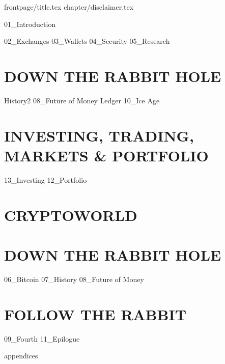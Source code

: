 \documentclass[a4paper,11pt,oneside,hyphens]{book}
\begin{document}
\frontmatter


{frontpage/title.tex}
{chapter/disclaimer.tex}

\clearpage


\tableofcontents


\listoffigures
{}

\listoftables
{}



\mainmatter
\pagestyle{fancy}

{01_Introduction}

{02_Exchanges}
{03_Wallets}
{04_Security}
{05_Research}

\part{DOWN THE RABBIT HOLE}

{History2}
{08_Future of Money}
{Ledger}
{10_Ice Age}

\part{INVESTING, TRADING, MARKETS \& PORTFOLIO}

{13_Investing}
{12_Portfolio}

\part{CRYPTOWORLD}


\part*{DOWN THE RABBIT HOLE}

{06_Bitcoin}
{07_History} 
{08_Future of Money} 

\part*{FOLLOW THE RABBIT}

{09_Fourth} 
{11_Epilogue}




\appendix
{appendices}



\backmatter


\printendnotes
\end{document}
